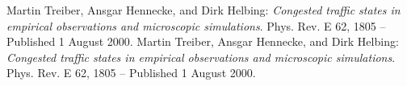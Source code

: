 \documentclass[colorinlistoftodos,twoside,twocolumn]{article} %
\begin{document}
\begin{thebibliography}{20}
	 Martin Treiber, Ansgar Hennecke, and Dirk Helbing: \emph{Congested traffic states in empirical observations and microscopic simulations}. Phys. Rev. E 62, 1805 – Published 1 August 2000.
	 Martin Treiber, Ansgar Hennecke, and Dirk Helbing: \emph{Congested traffic states in empirical observations and microscopic simulations}. Phys. Rev. E 62, 1805 – Published 1 August 2000.
\end{thebibliography}
\end{document}
